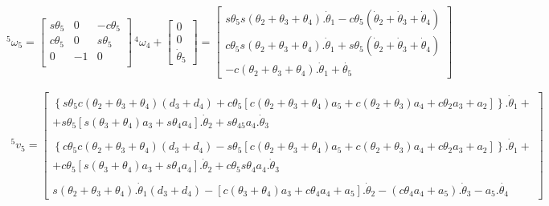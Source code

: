 \begin{equation}
    ^5\omega_5 = \begin{bmatrix}
        s\theta_5 & 0 & -c\theta_5 \\
        c\theta_5 & 0 & s\theta_5 \\
        0 & -1 & 0 \\
    \end{bmatrix} \, ^4\omega_4 + 
    \begin{bmatrix}
        0 \\ 0 \\ \dot{\theta}_5
    \end{bmatrix} = 
    \begin{bmatrix}
        s\theta_5s(\theta_2+\theta_3+\theta_4).\dot{\theta}_1 - c\theta_5(\dot{\theta}_2 + \dot{\theta}_3 + \dot{\theta}_4) \\
        c\theta_5s(\theta_2+\theta_3+\theta_4).\dot{\theta}_1 + s\theta_5(\dot{\theta}_2 + \dot{\theta}_3 + \dot{\theta}_4) \\ 
        -c(\theta_2+\theta_3+\theta_4).\dot{\theta}_1 + \dot{\theta_5}
    \end{bmatrix}
\end{equation}

\begin{equation}
\begin{gathered}
    ^5v_5 = \begin{bmatrix}
        \left\{s\theta_5c(\theta_2 + \theta_3 + \theta_4)(d_3+d_4) + c\theta_5[c(\theta_2 + \theta_3 + \theta_4)a_5 + c(\theta_2 + \theta_3)a_4 + c\theta_2a_3 + a_2]\right\}.\dot{\theta}_1 + \\
        + s\theta_5[s(\theta_3+\theta_4)a_3 + s\theta_4a_4].\dot{\theta}_2 + s\theta_{45}a_4.\dot{\theta}_3 \\ 
        \\
        \left\{c\theta_5c(\theta_2 + \theta_3 + \theta_4)(d_3+d_4) - s\theta_5[c(\theta_2 + \theta_3 + \theta_4)a_5 + c(\theta_2 + \theta_3)a_4 + c\theta_2a_3 + a_2]\right\}.\dot{\theta}_1 + \\
        + c\theta_5[s(\theta_3+\theta_4)a_3 + s\theta_4a_4].\dot{\theta}_2 + c\theta_5s\theta_4a_4.\dot{\theta}_3 \\ 
        \\
        s(\theta_2 + \theta_3 + \theta_4).\dot{\theta}_1(d_3+d_4) - [c(\theta_3+\theta_4)a_3 + c\theta_4a_4 + a_5].\dot{\theta}_2 - (c\theta_4a_4 + a_5).\dot{\theta}_3 - a_5.\dot{\theta_4}
    \end{bmatrix}
\end{gathered}
\end{equation}

